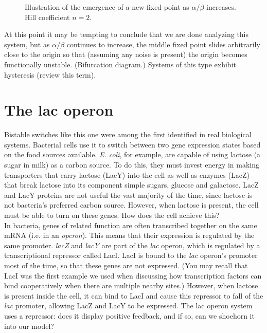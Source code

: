 \documentclass{article}
\begin{document}
\begin{figure}[htp] 
\caption{Illustration of the emergence of a new fixed point as $\alpha/\beta$ increases. Hill coefficient $n=2$.} \label{fig:pfb}
\end{figure}

At this point it may be tempting to conclude that we are done analyzing this system, but as $\alpha/\beta$ continues to increase, the middle fixed point slides arbitrarily close to the origin so that (assuming any noise is present) the origin becomes functionally unstable. (Bifurcation diagram.) Systems of this type exhibit hysteresis (review this term).


\section*{The lac operon}

Bistable switches like this one were among the first identified in real biological systems. Bacterial cells use it to switch between two gene expression states based on the food sources available. \textit{E. coli}, for example, are capable of using lactose (a sugar in milk) as a carbon source. To do this, they must invest energy in making transporters that carry lactose (LacY) into the cell as well as enzymes (LacZ) that break lactose into its component simple sugars, glucose and galactose. LacZ and LacY proteins are not useful the vast majority of the time, since lactose is not bacteria's preferred carbon source. However, when lactose is present, the cell must be able to turn on these genes. How does the cell achieve this?\\

In bacteria, genes of related function are often transcribed together on the same mRNA (i.e. in an \textit{operon}). This means that their expression is regulated by the same promoter. \textit{lacZ} and \textit{lacY} are part of the \textit{lac} operon, which is regulated by a transcriptional repressor called LacI. LacI is bound to the \textit{lac} operon's promoter most of the time, so that these genes are not expressed. (You may recall that LacI was the first example we used when discussing how transcription factors can bind cooperatively when there are multiple nearby sites.) However, when lactose is present inside the cell, it can bind to LacI and cause this repressor to fall of the \textit{lac} promoter, allowing LacZ and LacY to be expressed. The lac operon system uses a repressor: does it display positive feedback, and if so, can we shoehorn it into our model?\\
\end{document}
